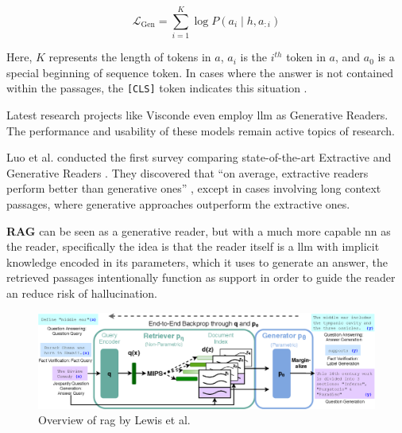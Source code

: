 \begin{equation}
    \mathcal{L}_{\mathrm{Gen}}=\sum_{i=1}^K \log P\left(a_i \mid h, a_{: i}\right)
\end{equation}

Here, $K$ represents the length of tokens in $a$, $a_i$ is the $i^{th}$ token in $a$, and $a_0$ is a special beginning of sequence token. In cases where the answer is not contained within the passages, the \verb|[CLS]| token indicates this situation \cite{luo_choose_2022,zhu_retrieving_2021}.

Latest research projects like Visconde \cite{pereira_visconde_2022} even employ \gls{llm} as Generative Readers. The performance and usability of these models remain active topics of research.

Luo et al. conducted the first survey comparing state-of-the-art Extractive and Generative Readers \cite{luo_choose_2022}. They discovered that \enquote{on average, extractive readers perform better than generative ones} \cite{luo_choose_2022}, except in cases involving long context passages, where generative approaches outperform the extractive ones.

\textbf{RAG} can be seen as a generative reader, but with a much more capable \gls{nn} as the reader, specifically the idea is that the reader itself is a \gls{llm} with implicit knowledge encoded in its parameters, which it uses to generate an answer, the retrieved passages intentionally function as support in order to guide the reader an reduce risk of hallucination. 

\begin{figure}
    \centering
    \includegraphics[width=\textwidth]{Grafiken/RAG-Figure1.png}
    \caption{Overview of \gls{rag} by Lewis et al. \cite{lewis_retrieval-augmented_2021}}
    \label{fig:rag}
\end{figure}

